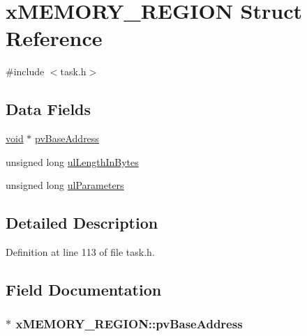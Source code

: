 \hypertarget{structx_m_e_m_o_r_y___r_e_g_i_o_n}{\section{x\-M\-E\-M\-O\-R\-Y\-\_\-\-R\-E\-G\-I\-O\-N Struct Reference}
\label{structx_m_e_m_o_r_y___r_e_g_i_o_n}
}


{\ttfamily \#include $<$task.\-h$>$}

\subsection*{Data Fields}
\begin{DoxyCompactItemize}
\item 
\hyperlink{group___n_a_m_e_ga18028b8badbf1ea7e704ccac3c488e82}{void} $\ast$ \hyperlink{structx_m_e_m_o_r_y___r_e_g_i_o_n_a16d9e901c577580d5114c04c4d5d8867}{pv\-Base\-Address}
\item 
unsigned long \hyperlink{structx_m_e_m_o_r_y___r_e_g_i_o_n_ac296475c5bdf95765db1786789e3aa4d}{ul\-Length\-In\-Bytes}
\item 
unsigned long \hyperlink{structx_m_e_m_o_r_y___r_e_g_i_o_n_a8750b0cad9c8b2c602ca9f0f2342b3aa}{ul\-Parameters}
\end{DoxyCompactItemize}


\subsection{Detailed Description}


Definition at line 113 of file task.\-h.



\subsection{Field Documentation}
\hypertarget{structx_m_e_m_o_r_y___r_e_g_i_o_n_a16d9e901c577580d5114c04c4d5d8867}{
\subsubsection[{pv\-Base\-Address}]{ $\ast$ x\-M\-E\-M\-O\-R\-Y\-\_\-\-R\-E\-G\-I\-O\-N\-::pv\-Base\-Address}}\label{structx_m_e_m_o_r_y___r_e_g_i_o_n_a16d9e901c577580d5114c04c4d5d8867}


